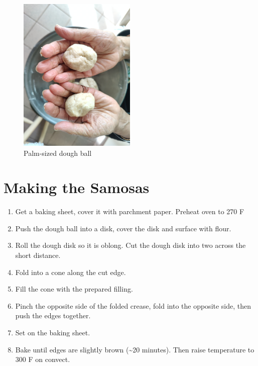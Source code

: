 \begin{figure}[H]
  \centering
  \includegraphics[width=0.5\textwidth]{Samosa/Images/IMG_20231230_142118.jpg}
  \caption{Palm-sized dough ball}
  \label{fig:fig1}
\end{figure}

\section*{Making the Samosas}

\begin{enumerate}
  \item Get a baking sheet, cover it with parchment paper. Preheat oven to 270 F
  \item Push the dough ball into a disk, cover the disk and surface with flour.
  \item Roll the dough disk so it is oblong. Cut the dough disk into two across the short distance.
  \item Fold into a cone along the cut edge.
  \item Fill the cone with the prepared filling.
  \item Pinch the opposite side of the folded crease, fold into the opposite side, then push the edges together.
  \item Set on the baking sheet.
  \item Bake until edges are slightly brown (\textasciitilde 20 minutes). Then raise temperature to 300 F on convect.
\end{enumerate}


